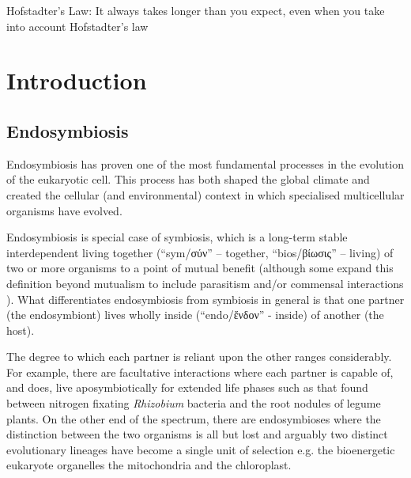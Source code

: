 \graphicspath{{chapters/1.Introduction/figures/}}

\begin{savequote}[75mm]
Hofstadter's Law: It always takes longer than you expect, even when you take into account Hofstadter's law
\end{savequote}

\chapter{Introduction}

\section{Endosymbiosis}

Endosymbiosis has proven one of the most fundamental processes in the evolution of the
eukaryotic cell. This process has both shaped the global climate and
created the cellular (and environmental) context in which specialised multicellular
organisms have evolved.

Endosymbiosis is special case of symbiosis, which is a long-term stable interdependent 
living together (``sym/σύν'' -- together, ``bios/βίωσις'' -- living) of two or more 
organisms to a point of mutual benefit \citep{DeBary1879,Pound1893} (although some expand 
this definition beyond mutualism to include parasitism and/or commensal interactions \citep{OMalley2015}).
What differentiates endosymbiosis from symbiosis in general is that one partner (the endosymbiont) lives wholly
inside (``endo/ἔνδον'' - inside) of another (the host).  

The degree to which each partner is reliant upon the other ranges considerably. 
For example, there are facultative interactions where each partner is
capable of, and does, live aposymbiotically for extended life phases such as that found between nitrogen
fixating \textit{Rhizobium} bacteria and the root nodules of legume plants.  On the other end of the spectrum,
there are endosymbioses where the distinction between the two organisms is all but lost and arguably
two distinct evolutionary lineages have become a single unit of selection e.g. the bioenergetic eukaryote organelles
the mitochondria and the chloroplast. 






